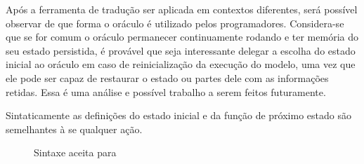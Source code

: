 Após a ferramenta de tradução ser aplicada em contextos diferentes, será
possível observar de que forma o oráculo é utilizado pelos programadores.
Considera-se que se for comum o oráculo permanecer continuamente rodando e ter
memória do seu estado persistida, é provável que seja interessante delegar a
escolha do estado inicial ao oráculo em caso de reinicialização da execução do
modelo, uma vez que ele pode ser capaz de restaurar o estado ou partes dele com
as informações retidas. Essa é uma análise e possível trabalho a serem feitos
futuramente.

Sintaticamente as definições do estado inicial e da função de próximo estado são
semelhantes à se qualquer ação.
\begin{figure}[h]
  \centering
  \caption{Sintaxe aceita para \TLA}
\label{fig:notacao-tla}
\end{figure}


